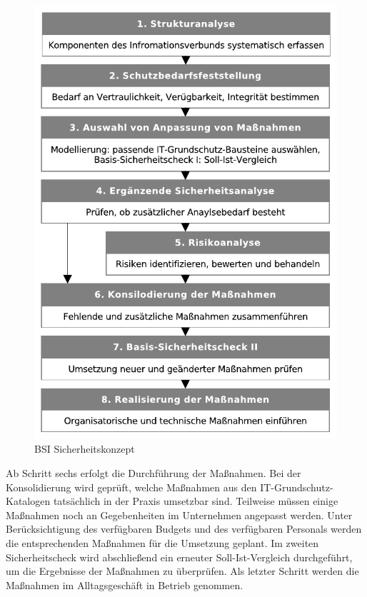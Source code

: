 \documentclass[11pt,a4paper]{report}
\begin{document}
\begin{figure}[htb]
\centering
\includegraphics[scale=0.7]{images/bsi_sicherheitskonzept.pdf}
\caption[BSI Sicherheitskonzept]{BSI Sicherheitskonzept\footnotemark}
\label{fig:bsi_sicherheit}
\end{figure}
Ab Schritt sechs erfolgt die Durchführung der Maßnahmen. Bei der Konsolidierung wird geprüft, welche Maßnahmen aus den IT-Grundschutz-Katalogen tatsächlich in der Praxis umsetzbar sind. Teilweise müssen einige Maßnahmen noch an Gegebenheiten im Unternehmen angepasst werden. Unter Berücksichtigung des verfügbaren Budgets und des verfügbaren Personals werden die entsprechenden Maßnahmen für die Umsetzung geplant. Im zweiten Sicherheitscheck wird abschließend ein erneuter Soll-Ist-Vergleich durchgeführt, um die Ergebnisse der Maßnahmen zu überprüfen. Als letzter Schritt werden die Maßnahmen im Alltagsgeschäft in Betrieb genommen.
\end{document}
